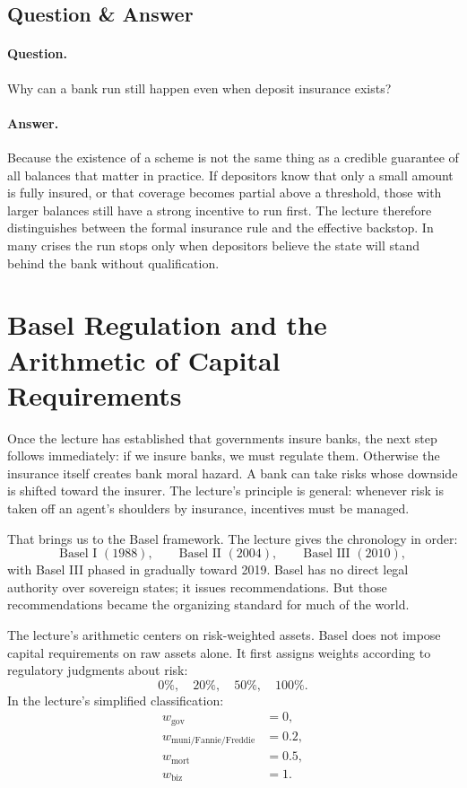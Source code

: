 \subsection{Question \& Answer}

\paragraph{Question.} Why can a bank run still happen even when deposit insurance exists?

\paragraph{Answer.} Because the existence of a scheme is not the same thing as a credible guarantee of all balances that matter in practice. If depositors know that only a small amount is fully insured, or that coverage becomes partial above a threshold, those with larger balances still have a strong incentive to run first. The lecture therefore distinguishes between the formal insurance rule and the effective backstop. In many crises the run stops only when depositors believe the state will stand behind the bank without qualification.

\section{Basel Regulation and the Arithmetic of Capital Requirements}

Once the lecture has established that governments insure banks, the next step follows immediately: if we insure banks, we must regulate them. Otherwise the insurance itself creates bank moral hazard. A bank can take risks whose downside is shifted toward the insurer. The lecture's principle is general: whenever risk is taken off an agent's shoulders by insurance, incentives must be managed.

That brings us to the Basel framework. The lecture gives the chronology in order:
\begin{equation}
\text{Basel I }(1988),\qquad \text{Basel II }(2004),\qquad \text{Basel III }(2010),
\end{equation}
with Basel III phased in gradually toward 2019. Basel has no direct legal authority over sovereign states; it issues recommendations. But those recommendations became the organizing standard for much of the world.

The lecture's arithmetic centers on risk-weighted assets. Basel does not impose capital requirements on raw assets alone. It first assigns weights according to regulatory judgments about risk:
\begin{equation}
0\%,\quad 20\%,\quad 50\%,\quad 100\%.
\end{equation}
In the lecture's simplified classification:
\begin{align}
w_{\text{gov}} &= 0,\\
w_{\text{muni/Fannie/Freddie}} &= 0.2,\\
w_{\text{mort}} &= 0.5,\\
w_{\text{biz}} &= 1.
\end{align}

